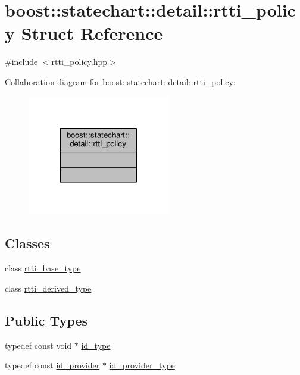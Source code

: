 \hypertarget{structboost_1_1statechart_1_1detail_1_1rtti__policy}{}\section{boost\+:\+:statechart\+:\+:detail\+:\+:rtti\+\_\+policy Struct Reference}
\label{structboost_1_1statechart_1_1detail_1_1rtti__policy}


{\ttfamily \#include $<$rtti\+\_\+policy.\+hpp$>$}



Collaboration diagram for boost\+:\+:statechart\+:\+:detail\+:\+:rtti\+\_\+policy\+:
\nopagebreak
\begin{figure}[H]
\begin{center}
\leavevmode
\includegraphics[width=176pt]{structboost_1_1statechart_1_1detail_1_1rtti__policy__coll__graph}
\end{center}
\end{figure}
\subsection*{Classes}
\begin{DoxyCompactItemize}
\item 
class \mbox{\hyperlink{classboost_1_1statechart_1_1detail_1_1rtti__policy_1_1rtti__base__type}{rtti\+\_\+base\+\_\+type}}
\item 
class \mbox{\hyperlink{classboost_1_1statechart_1_1detail_1_1rtti__policy_1_1rtti__derived__type}{rtti\+\_\+derived\+\_\+type}}
\end{DoxyCompactItemize}
\subsection*{Public Types}
\begin{DoxyCompactItemize}
\item 
typedef const void $\ast$ \mbox{\hyperlink{structboost_1_1statechart_1_1detail_1_1rtti__policy_a57d56a3531686fb2b92d733b5da620c2}{id\+\_\+type}}
\item 
typedef const \mbox{\hyperlink{structboost_1_1statechart_1_1detail_1_1id__provider}{id\+\_\+provider}} $\ast$ \mbox{\hyperlink{structboost_1_1statechart_1_1detail_1_1rtti__policy_afd9bc153e4b739bd085ea646f21c3cba}{id\+\_\+provider\+\_\+type}}
\end{DoxyCompactItemize}


